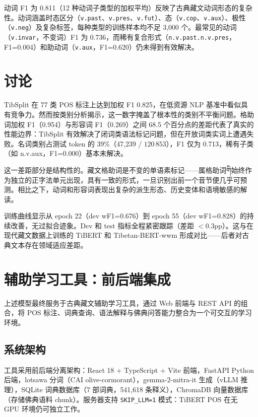 \documentclass[11pt,a4paper]{article}
\DeclareRobustCommand\tib[1]{{\tibetan #1}}
\begin{document}
动词 F1 为 0.811（12 种动词子类型的加权平均）反映了古典藏文动词形态的复杂性。动词涵盖时态区分（\texttt{v.past}、\texttt{v.pres}、\texttt{v.fut}）、态（\texttt{v.cop}、\texttt{v.aux}）、极性（\texttt{v.neg}）及复杂标签，每种类型的训练样本均不足 3,000 个。最常见的动词（\texttt{v.invar}，不变词）F1 为 0.736，而稀有复合形式（\texttt{n.v.past.n.v.pres}，F1=0.004）和助动词（\texttt{v.aux}，F1=0.620）仍未得到有效解决。

\section{讨论}

TibSplit 在 77 类 POS 标注上达到加权 F1 0.825，在低资源 NLP 基准中看似具有竞争力。然而按类别分析揭示，这一数字掩盖了根本性的类别不平衡问题。格助词加权 F1（0.954）与形容词 F1（0.269）之间 68.5 个百分点的差距代表了真实的性能边界：TibSplit 有效解决了闭词类语法标记问题，但在开放词类实词上遭遇失败。名词类别占测试 token 的 39\%（47,239 / $120\,853$），F1 仅为 0.713，稀有子类（如 n.v.aux，F1=0.000）基本未解决。

这一差距部分是结构性的。藏文格助词是不变的单语素标记——属格助词\tib{གི}始终作为独立的正字法单元出现，具有一致的形式，一旦识别出前一个音节便几乎可预测。相比之下，动词和形容词表现出复杂的派生形态、历史变体和语境敏感的解读。

训练曲线显示从 epoch 22（dev wF1=0.676）到 epoch 55（dev wF1=0.828）的持续改善，无过拟合迹象。Dev 和 test 指标全程紧密跟踪（差距 $< 0.3$pp）。这与在现代藏文数据上训练的 TiBERT 和 Tibetan-BERT-wwm 形成对比——后者对古典文本存在领域适应差距。

\section{辅助学习工具：前后端集成}

上述模型最终服务于古典藏文辅助学习工具，通过 Web 前端与 REST API 的组合，将 POS 标注、词典查询、语法解释与佛典问答能力整合为一个可交互的学习环境。

\subsection{系统架构}

工具采用前后端分离架构：React 18 + TypeScript + Vite 前端，FastAPI Python 后端，lotsawa 分词（CAI olive-cormorant），gemma-2-mitra-it 生成（vLLM 推理），SQLite 词典数据库（7 部词典，541,618 条释义），ChromaDB 向量数据库（存储佛典语料 chunk）。服务器支持 \texttt{SKIP\_LLM=1} 模式：TiBERT POS 在无 GPU 环境仍可独立工作。
\end{document}
